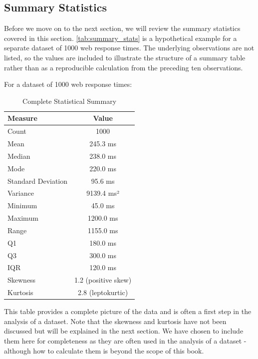 \subsection*{Summary Statistics}

Before we move on to the next section, we will review the summary statistics covered in this section. \autoref{tab:summary_stats} is a hypothetical example for a separate dataset of 1000 web response times. The underlying observations are not listed, so the values are included to illustrate the structure of a summary table rather than as a reproducible calculation from the preceding ten observations.

\begin{example}

For a dataset of 1000 web response times:

\begin{table}[htbp]
\centering
\renewcommand{\arraystretch}{1.3}
\begin{tabular}{|l|c|}
\hline
\textbf{Measure} & \textbf{Value} \\
\hline
Count & 1000 \\
Mean & 245.3 ms \\
Median & 238.0 ms \\
Mode & 220.0 ms \\
Standard Deviation & 95.6 ms \\
Variance & 9139.4 ms² \\
Minimum & 45.0 ms \\
Maximum & 1200.0 ms \\
Range & 1155.0 ms \\
Q1 & 180.0 ms \\
Q3 & 300.0 ms \\
IQR & 120.0 ms \\
Skewness & 1.2 (positive skew) \\
Kurtosis & 2.8 (leptokurtic) \\
\hline
\end{tabular}
\caption{Complete Statistical Summary}
\label{tab:summary_stats}
\end{table}
\end{example}

This table provides a complete picture of the data and is often a first step in the analysis of a dataset. Note that the skewness and kurtosis have not been discussed but will be explained in the next section. We have chosen to include them here for completeness as they are often used in the analysis of a dataset - although how to calculate them is beyond the scope of this book.


